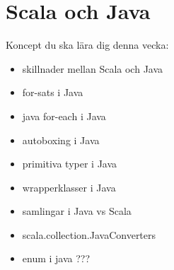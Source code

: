 \chapter{Scala och Java}\label{chapter:W11}
Koncept du ska lära dig denna vecka:
\begin{multicols}{2}\begin{itemize}[nosep,label={$\square$},leftmargin=*]
\item skillnader mellan Scala och Java
\item for-sats i Java
\item java for-each i Java
\item autoboxing i Java
\item primitiva typer i Java
\item wrapperklasser i Java
\item samlingar i Java vs Scala
\item scala.collection.JavaConverters
\item enum i java ???\end{itemize}\end{multicols}
